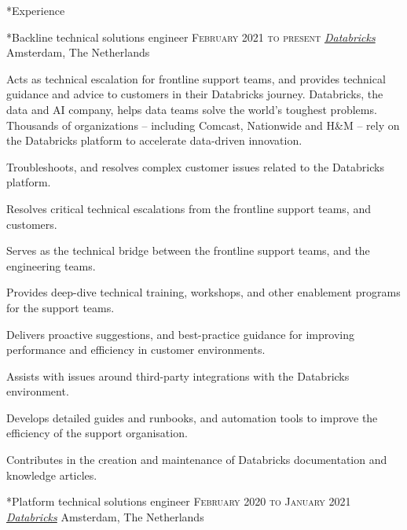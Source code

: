 \documentclass[10pt, a4paper, final]{article}
\begin{document}
\begin{section}*{Experience}
  \begin{subsection}*{Backline technical solutions engineer \hfill\textsc{February 2021 to present}}
    \href{https://databricks.com/}{\textit{Databricks}} \hfill Amsterdam, The Netherlands
    \vspace{1em}

    Acts as technical escalation for frontline support teams, and provides technical guidance and advice to customers in their Databricks journey. Databricks, the data and AI company, helps data teams solve the world's toughest problems. Thousands of organizations -- including Comcast, Nationwide and H{\&}M -- rely on the Databricks platform to accelerate data-driven innovation.
    \vspace{1em}
    \begin{compactitem}
      \item Troubleshoots, and resolves complex customer issues related to the Databricks platform.
      \item Resolves critical technical escalations from the frontline support teams, and customers.
      \item Serves as the technical bridge between the frontline support teams, and the engineering teams.
      \item Provides deep-dive technical training, workshops, and other enablement programs for the support teams.
      \item Delivers proactive suggestions, and best-practice guidance for improving performance and efficiency in customer environments.
      \item Assists with issues around third-party integrations with the Databricks environment.
      \item Develops detailed guides and runbooks, and automation tools to improve the efficiency of the support organisation.
      \item Contributes in the creation and maintenance of Databricks documentation and knowledge articles.
      
    \end{compactitem}
  \end{subsection}
  \vspace{2em}

  \begin{subsection}*{Platform technical solutions engineer \hfill\textsc{February 2020 to January 2021}}
    \href{https://databricks.com/}{\textit{Databricks}} \hfill Amsterdam, The Netherlands
    \vspace{1em}


\end{subsection}
\end{section}
\end{document}
